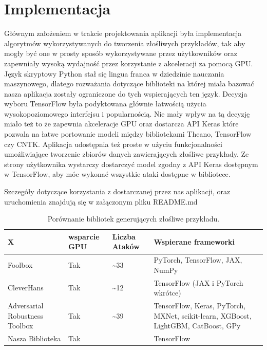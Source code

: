 \documentclass[
    left=2.5cm,         %
    right=2.5cm,        %
    top=2.5cm,          %
    bottom=3cm,         %
    bindingoffset=6mm,  %
    nohyphenation=false %
]{eiti/eiti-thesis}
\begin{document}
\section{Implementacja}
Głównym założeniem w trakcie projektowania aplikacji była implementacja algorytmów wykorzystywanych do
tworzenia złośliwych przykładów, tak aby mogły być one w prosty sposób wykorzystywane przez użytkowników oraz zapewniały
wysoką wydajność przez korzystanie z akceleracji za pomocą GPU.
Język skryptowy Python stał się lingua franca w dziedzinie nauczania maszynowego,
dlatego rozważania dotyczące biblioteki na której miała bazować nasza aplikacja zostały ograniczone do tych wspierających ten język.
Decyzja wyboru TensorFlow była podyktowana głównie łatwością użycia wysokopoziomowego interfejsu i popularnością. Nie mały wpływ na tą decyzję miało też to że
zapewnia akceleracje GPU oraz dostarcza API Keras które pozwala na łatwe portowanie modeli między bibliotekami Theano\cite{2016arXiv160502688short}, TensorFlow\cite{DBLP:journals/corr/AbadiABBCCCDDDG16} czy CNTK\cite{cntk}.
Aplikacja udostępnia też proste w użyciu funkcjonalności umożliwiające tworzenie zbiorów danych zawierających złośliwe przykłady.
Ze strony użytkownika wystarczy dostarczyć model zgodny z API Keras dostępnym w TensorFlow, aby móc wykonać wszystkie ataki
dostępne w bibliotece.

Szczegóły dotyczące korzystania z dostarczanej przez nas aplikacji, oraz uruchomienia znajdują się w załączonym pliku README.md

\begin{center}
    \begin{table}[ht]

    \caption{Porównanie bibliotek generujących złośliwe przykładu.}
    \begin{tabular}{|>{\centering}p{2.5cm}|>{\centering}p{2.5cm}|>{\centering}p{2.5cm}|p{7.0cm}|}
        \hline
        X & wsparcie GPU & Liczba Ataków & Wspierane frameworki\\
        \hline
        Foolbox & Tak\footnotemark[1] & \textasciitilde33 & PyTorch, TensorFlow, JAX, NumPy\\
        \hline
        CleverHans & Tak\footnotemark[1] & \textasciitilde12 & TensorFlow (JAX i PyTorch wkrótce)\\
        \hline
        Adversarial Robustness Toolbox & Tak\footnotemark[1] & \textasciitilde39 & TensorFlow, Keras, PyTorch, MXNet, scikit-learn, XGBoost, LightGBM, CatBoost, GPy \\
        \hline
        Nasza Biblioteka & Tak & 6 & TensorFlow\\
        \hline
    \end{tabular}
    \end{table}
\end{center}
\end{document}

